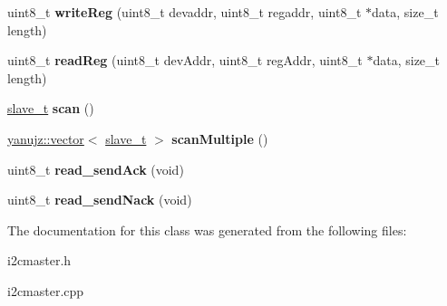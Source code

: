 \begin{DoxyCompactItemize}
\item 
\mbox{\label{classI2CMaster_a8de7eba73af26425844c8e367278067b}} 
uint8\+\_\+t {\bfseries write\+Reg} (uint8\+\_\+t devaddr, uint8\+\_\+t regaddr, uint8\+\_\+t $\ast$data, size\+\_\+t length)
\item 
\mbox{\label{classI2CMaster_aabfbdaa651c8965928f2aee51a554a86}} 
uint8\+\_\+t {\bfseries read\+Reg} (uint8\+\_\+t dev\+Addr, uint8\+\_\+t reg\+Addr, uint8\+\_\+t $\ast$data, size\+\_\+t length)
\item 
\mbox{\label{classI2CMaster_a90399cf812db2fb854b3d198e2771797}} 
\hyperlink{structslave__t}{slave\+\_\+t} {\bfseries scan} ()
\item 
\mbox{\label{classI2CMaster_a9462113b6cf72724be7bbc92becc5f45}} 
\hyperlink{classyanujz_1_1vector}{yanujz\+::vector}$<$ \hyperlink{structslave__t}{slave\+\_\+t} $>$ {\bfseries scan\+Multiple} ()
\item 
\mbox{\label{classI2CMaster_a83ef1a0c9c1e4eaa046bc97afa281f1f}} 
uint8\+\_\+t {\bfseries read\+\_\+send\+Ack} (void)
\item 
\mbox{\label{classI2CMaster_a57d0a938061fa240f144ebf0981d7e77}} 
uint8\+\_\+t {\bfseries read\+\_\+send\+Nack} (void)
\end{DoxyCompactItemize}


The documentation for this class was generated from the following files\+:\begin{DoxyCompactItemize}
\item 
i2cmaster.\+h\item 
i2cmaster.\+cpp\end{DoxyCompactItemize}
